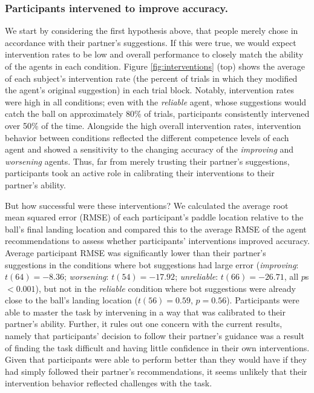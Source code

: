 \documentclass[10pt,letterpaper]{article}
\begin{document}
\subsubsection{Participants intervened to improve accuracy.} 

We start by considering the first hypothesis above, that people merely chose in accordance with their partner's suggestions. If this were true, we would expect intervention rates to be low and overall performance to closely match the ability of the agents in each condition. Figure \ref{fig:interventions} (top) shows the average of each subject's intervention rate (the percent of trials in which they modified the agent's original suggestion) in each trial block. Notably, intervention rates were high in all conditions; even with the \textit{reliable} agent, whose suggestions would catch the ball on approximately 80\% of trials, participants consistently intervened over 50\% of the time. Alongside the high overall intervention rates, intervention behavior between conditions reflected the different competence levels of each agent and showed a sensitivity to the changing accuracy of the \textit{improving} and \textit{worsening} agents. Thus, far from merely trusting their partner's suggestions, participants took an active role in calibrating their interventions to their partner's ability.

But how successful were these interventions? We calculated the average root mean squared error (RMSE) of each participant's paddle location relative to the ball's final landing location and compared this to the average RMSE of the agent recommendations to assess whether participants' interventions improved accuracy. Average participant RMSE was significantly lower than their partner's suggestions in the conditions where bot suggestions had large error (\textit{improving}: $t(64) = -8.36$; \textit{worsening}: $t(54) = -17.92$; \textit{unreliable}: $t(66) = -26.71$, all $p$s $<0.001$), but not in the \textit{reliable} condition where bot suggestions were already close to the ball's landing location ($t(56) = 0.59$, $p = 0.56$). Participants were able to master the task by intervening in a way that was calibrated to their partner's ability. Further, it rules out one concern with the current results, namely that participants' decision to follow their partner's guidance was a result of finding the task difficult and having little confidence in their own interventions. Given that participants were able to perform better than they would have if they had simply followed their partner's recommendations, it seems unlikely that their intervention behavior reflected challenges with the task.
\end{document}

